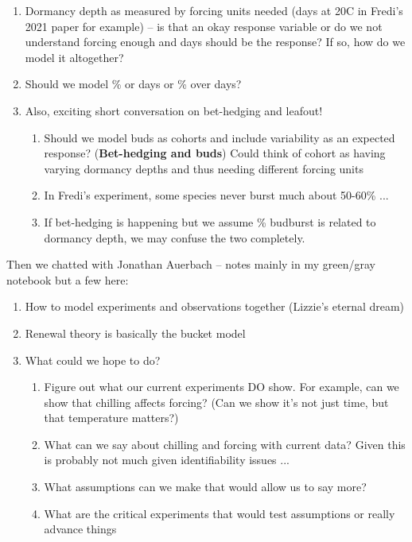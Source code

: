 \documentclass[11pt,letter]{article}
\begin{document}
\begin{enumerate}
\item Dormancy depth as measured by forcing units needed (days at 20\degree C in Fredi's 2021 paper for example) -- is that an okay response variable or do we not understand forcing enough and days should be the response? If so, how do we model it altogether?
\item Should we model \% or days or \% over days?
\item Also, exciting short conversation on bet-hedging and leafout!
\begin{enumerate}
\item Should we model buds as cohorts and include variability as an expected response? ({\bf Bet-hedging and buds}) Could think of cohort as having varying dormancy depths and thus needing different forcing units
\item In Fredi's experiment, some species never burst much about 50-60\% ... 
\item If bet-hedging is happening but we assume \% budburst is related to dormancy depth, we may confuse the two completely. 
\end{enumerate}
\end{enumerate}

Then we chatted with Jonathan Auerbach -- notes mainly in my green/gray notebook but a few here:

\begin{enumerate}
\item How to model experiments and observations together (Lizzie's eternal dream)
\item Renewal theory is basically the bucket model
\item What could we hope to do?
\begin{enumerate}
\item Figure out what our current experiments DO show. For example, can we show that chilling affects forcing? (Can we show it's not just time, but that temperature matters?)
\item What can we say about chilling and forcing with current data? Given this is probably not much given identifiability issues ...
\item What assumptions can we make that would allow us to say more? 
\item What are the critical experiments that would test assumptions or really advance things
\end{enumerate}
\end{enumerate}
\end{document}

